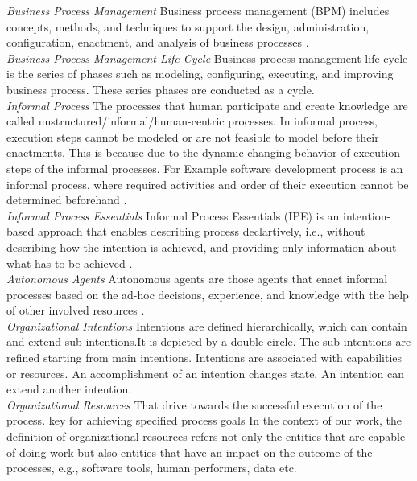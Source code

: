 \textit{Business Process Management} Business process management (BPM) includes concepts, methods, and techniques to support the design, administration, configuration, enactment, and analysis of business processes \cite{Weske2012}. \\

\textit{Business Process Management Life Cycle} Business process management life cycle is the series of phases such as modeling, configuring, executing, and improving business process. These series phases are conducted as a cycle. \cite{Weske2012}\\

\textit{Informal Process}  The processes that human participate and create knowledge are called unstructured/informal/human-centric processes. In informal process, execution steps cannot be modeled or are not feasible to model before their enactments. This is because due to the dynamic changing behavior of execution steps of the informal processes.  For Example software development process is an informal process, where required activities and order of their execution cannot be determined beforehand \cite{Sungur2015}.       \\

\textit{Informal Process Essentials} Informal Process Essentials (IPE) is an intention-based approach that enables describing process declartively, i.e., without describing how the intention is achieved, and providing only information about what has to be achieved \cite{Sungur2014a}. \\

\textit{Autonomous Agents} Autonomous agents are those agents that enact informal processes based on the ad-hoc decisions, experience, and knowledge with the help of other involved resources   \cite{Sungur2015}. \\

\textit{Organizational Intentions} Intentions are defined hierarchically, which can contain and extend sub-intentions.It is depicted by a double circle. The sub-intentions are refined starting from main intentions. Intentions are associated with capabilities or resources. An accomplishment of an intention changes state. An intention can extend another intention.        \\

\textit{Organizational Resources} That drive towards the successful execution of the process. key for achieving specified process goals
In the context of our work, the definition of organizational resources refers not only the entities that are capable of doing work but also entities that have an impact on the outcome of the processes, e.g., software tools, human performers, data etc.      \\



